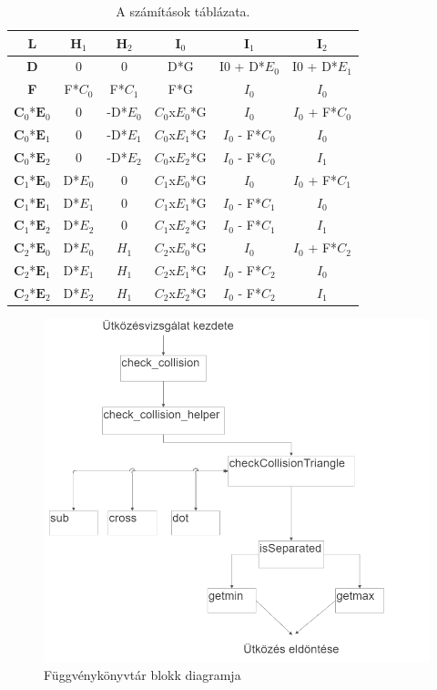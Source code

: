\newpage
\begin{table}[h]
	\centering
	\caption{A számítások táblázata.}
	\begin{tabular}{|c||c|c|c|c|c|}
		\hline
		\textbf{L}     & $\textbf{H}_1$   & $\textbf{H}_2$    & $\textbf{I}_0$      & $\textbf{I}_1$        & $\textbf{I}_2$        \\ \hline
		\textbf{D}     & 0    & 0     & D*G     & I0 + D*$E_0$ & I0 + D*$E_1$ \\ \hline
		\textbf{F}     & F*$C_0$ & F*$C_1$  & F*G     & $I_0$        & $I_0$        \\ \hline
		$\textbf{C}_0$*$\textbf{E}_0$ & 0    & -D*$E_0$ & $C_0$x$E_0$*G & $I_0$        & $I_0$ + F*$C_0$ \\ \hline
		$\textbf{C}_0$*$\textbf{E}_1$ & 0    & -D*$E_1$ & $C_0$x$E_1$*G & $I_0$ - F*$C_0$ & $I_0$        \\ \hline
		$\textbf{C}_0$*$\textbf{E}_2$ & 0    & -D*$E_2$ & $C_0$x$E_2$*G & $I_0$ - F*$C_0$ & $I_1$        \\ \hline
		$\textbf{C}_1$*$\textbf{E}_0$ & D*$E_0$ & 0     & $C_1$x$E_0$*G & $I_0$        & $I_0$ + F*$C_1$ \\ \hline
		$\textbf{C}_1$*$\textbf{E}_1$ & D*$E_1$ & 0     & $C_1$x$E_1$*G & $I_0$ - F*$C_1$ & $I_0$        \\ \hline
		$\textbf{C}_1$*$\textbf{E}_2$ & D*$E_2$ & 0     & $C_1$x$E_2$*G & $I_0$ - F*$C_1$ & $I_1$        \\ \hline
		$\textbf{C}_2$*$\textbf{E}_0$ & D*$E_0$ & $H_1$    & $C_2$x$E_0$*G & $I_0$        & $I_0$ + F*$C_2$ \\ \hline
		$\textbf{C}_2$*$\textbf{E}_1$ & D*$E_1$ & $H_1$    & $C_2$x$E_1$*G & $I_0$ - F*$C_2$ & $I_0$        \\ \hline
		$\textbf{C}_2$*$\textbf{E}_2$ & D*$E_2$ & $H_1$   & $C_2$x$E_2$*G & $I_0$ - F*$C_2$ & $I_1$        \\ \hline
	\end{tabular}
\end{table}
\newpage



\begin{figure}[h]
	\centering
	\includegraphics[width=15truecm, height=15truecm]{images/blokk_diagram.png}
	\caption{Függvénykönyvtár blokk diagramja}
	\label{fig:blokkdiagram}
\end{figure}


\newpage
